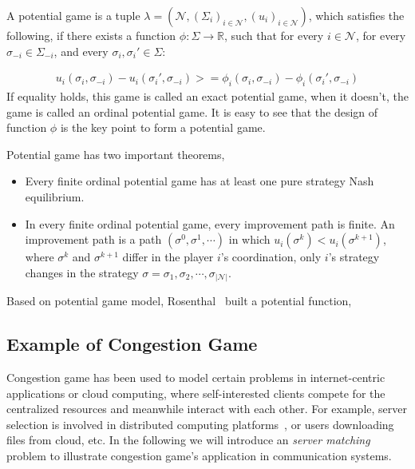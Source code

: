 A potential game is a tuple $\lambda=(\mathcal{N},(\Sigma_i)_{i \in \mathcal{N}},(u_i)_{i\in \mathcal{N}})$, which satisfies the following, if there exists a function $\phi: \Sigma\rightarrow \mathbb{R}$, such that for every $i\in \mathcal{N}$, for every $\sigma_{-i}\in \Sigma_{-i}$, and every $\sigma_i, \sigma_i'\in \Sigma$:

\begin{equation}
\label{2:1}
\begin{split}
u_i(\sigma_i, \sigma_{-i})-u_i(\sigma_i', \sigma_{-i}) >= \phi_i(\sigma_i, \sigma_{-i})-\phi_i(\sigma_i', \sigma_{-i})
\end{split}
\end{equation}
If equality holds, this game is called an exact potential game, when it doesn't, the game is called an ordinal potential game.
It is easy to see that the design of function $\phi$ is the key point to form a potential game.

Potential game has two important theorems,
\begin{itemize}
\item Every finite ordinal potential game has at least one pure strategy Nash equilibrium.
\item In every finite ordinal potential game, every improvement path is finite.
An improvement path is a path $(\sigma^0, \sigma^1, \cdots)$ in which $u_i(\sigma^k) < u_i(\sigma^{k+1}) $, where $\sigma^k$ and $\sigma^{k+1}$ differ in the player $i$'s coordination, \ie only $i$'s strategy changes in the strategy $\sigma={\sigma_1, \sigma_2, \cdots, \sigma_{|\mathcal{N}|}}$.

\end{itemize}

Based on potential game model, Rosenthal~\cite{Rosenthal} built a potential function,
%


\subsection{Example of Congestion Game}
Congestion game has been used to model certain problems in internet-centric applications or cloud computing, where self-interested clients compete for the centralized resources and meanwhile interact with each other.
For example, server selection is involved in distributed computing platforms~\cite{Cloud_Computing_2010}, or users downloading files from cloud, etc.
In the following we will introduce an \textit{server matching}~\cite{kothari:congestion_serverMatching} problem to illustrate congestion game's application in communication systems.

